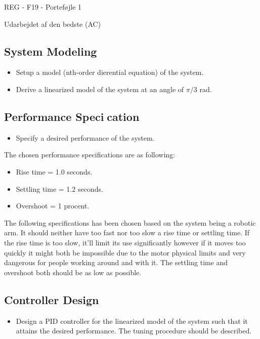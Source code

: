 \documentclass[12pt]{article}
\begin{document}
\raggedright
\huge
REG - F19 - Porteføjle 1 \linebreak
\normalsize

\large
Udarbejdet af den bedste (AC)

\subsection*{System Modeling}
\begin{itemize}
  \item Setup a model (nth-order dierential equation) of the system.
  \item Derive a linearized model of the system at an angle of $\pi/3$ rad.
\end{itemize}

\subsection*{Performance Specication}
\begin{itemize}
  \item Specify a desired performance of the system.
\end{itemize}
The chosen performance specifications are as following:
\begin{itemize}
  \item Rise time = 1.0 seconds.
  \item Settling time = 1.2 seconds.
  \item Overshoot = 1 procent.
\end{itemize}
 The following specifications has been chosen based on the system being a robotic arm. It should neither have too fast nor too slow a rise time or settling time. If the rise time is too slow, it'll limit its use significantly however if it moves too quickly it might both be impossible due to the motor physical limits and very dangerous for people working around and with it. The settling time and overshoot both should be as low as possible.
\subsection*{Controller Design}
\begin{itemize}
  \item Design a PID controller for the linearized model of the system such that it attains the desired performance. The tuning procedure should be described.
\end{itemize}
\end{document}
